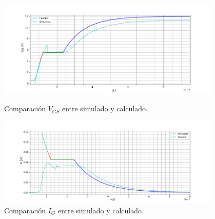 \begin{figure}[H]
	\centering
	\begin{minipage}{0.45\textwidth}
		\centering
		\includegraphics[width=0.95\textwidth]{ImagenesEjercicio-1/sim_encendido_gate} %
		\caption{Comparación $V_{GS}$ entre simulado y calculado.}
		\label{ej1:fig:sim_encendido_gate}
	\end{minipage}\hfill
	\begin{minipage}{0.45\textwidth}
		\centering
		\includegraphics[width=0.95\textwidth]{ImagenesEjercicio-1/sim_encendido_gate_i} %
		\caption{Comparación $I_{G}$ entre simulado y calculado.}
		\label{ej1:fig:sim_encendido_gate_i}
	\end{minipage}
\end{figure}

